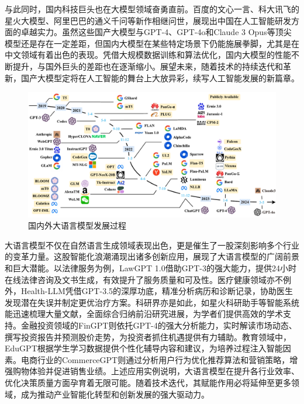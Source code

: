 \documentclass[a4paper]{report}
\begin{document}
与此同时，国内科技巨头也在大模型领域奋勇直前。百度的文心一言、科大讯飞的星火大模型、阿里巴巴的通义千问等新作相继问世，展现出中国在人工智能研发方面的卓越实力。虽然这些国产大模型与GPT-4、GPT-4o和Claude 3 Opus等顶尖模型还是存在一定差距，但国内大模型在某些特定场景下仍能施展拳脚，尤其是在中文领域有着出色的表现。凭借大规模数据训练和算法优化，国内大模型的性能不断提升，与国外巨头的差距也在逐渐缩小。展望未来，随着技术的持续迭代和革新，国产大模型定将在人工智能的舞台上大放异彩，续写人工智能发展的新篇章\cite{zhao2023survey}。%
\begin{figure}[H]
	\centering
	\includegraphics[width=\textwidth]{figures/LLMs_History.PDF}
	\caption{国内外大语言模型发展过程}
	\label{国内外大语言模型发展过程}
\end{figure}

大语言模型不仅在自然语言生成领域表现出色，更是催生了一股深刻影响多个行业的变革力量。这股智能化浪潮涌现出诸多创新应用，展现了大语言模型的广阔前景和巨大潜能。以法律服务为例，LawGPT 1.0借助GPT-3的强大能力，提供24小时在线法律咨询及文书生成，有效提升了服务质量和可及性。医疗健康领域亦不例外，Health-LLM凭借GPT-3.5的深厚功底，精准分析病历和诊断记录，协助医生发现潜在失误并制定更优治疗方案。科研界亦是如此，如星火科研助手等智能系统能迅速梳理大量文献，全面综合归纳前沿研究进展，为学者们提供高效的学术支持。金融投资领域的FinGPT则依托GPT-4的强大分析能力，实时解读市场动态、撰写投资报告并预测股价走势，为投资者抓住机遇提供有力辅助。教育领域中，EduGPT根据学生学习数据提供个性化辅导内容和建议，为培养过程注入智能因素。电商行业的CommerceGPT则通过分析用户行为优化推荐算法和营销策略，增强购物体验并促进销售业绩。上述应用实例说明，大语言模型在提升各行业效率、优化决策质量方面孕育着无限可能。随着技术迭代，其赋能作用必将延伸至更多领域，成为推动产业智能化转型和创新发展的强大驱动力。
\end{document}
